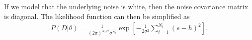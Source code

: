\documentclass[11pt,a4paper]{article}
\begin{document}
If we model that the underlying noise is white, then the noise covariance matrix is diagonal. The likelihood function can then be simplified as
\begin{align}
P(D | \theta)
= \frac{1}{(2\pi)^{N_t/2} \sigma^{N_t}}  \exp\left[ - \frac{1}{2\sigma^2} \sum_{i=1}^{N_t} (s - h)^2 \right]  .
\end{align}
















\end{document}
